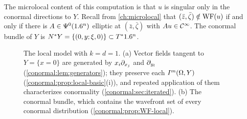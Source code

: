 The microlocal content of this computation is that $u$ is singular only in the
conormal directions to $Y$.  Recall from \cref{ch:microlocal} that
$(\bar z,\bar\zeta)\notin\operatorname{WF}(u)$ if and only if there is $A\in\Psi^{0}(1.6^n)$
elliptic at $(\bar z,\bar\zeta)$ with $Au\in\mathcal{C}^\infty$.  The conormal bundle of $Y$
is $N^*Y=\{(0,y;\xi,0)\}\subset T^*1.6^n$.

\begin{figure}[htbp]
\centering
{}
\caption[Vector fields tangent to $Y$ and the conormal bundle]{The local model
with $k=d=1$. (a) Vector fields tangent to $Y=\{x=0\}$ are generated by
$x_i\partial_{x_j}$ and $\partial_{y_l}$ (\cref{conormal:lem:generators}); they preserve
each $I^{m}(\Omega,Y)$ (\cref{conormal:prop:local-basic}(i)), and repeated
application of them characterizes conormality (\cref{conormal:sec:iterated}).
(b) The conormal bundle, which contains the wavefront set of every conormal
distribution (\cref{conormal:prop:WF-local}).}
\label{conormal:fig:local}
\end{figure}


